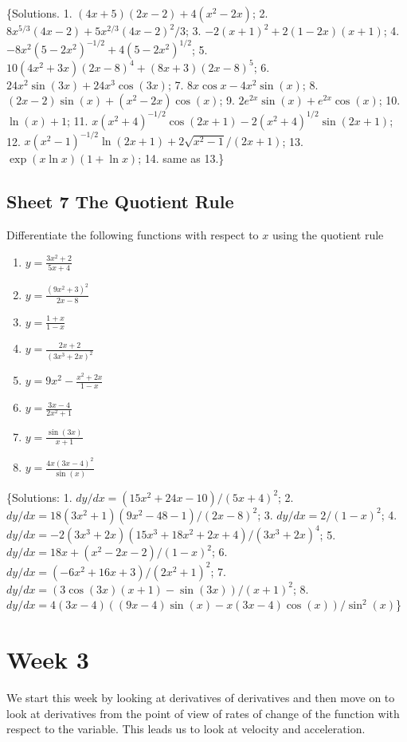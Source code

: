 \documentclass[
  english,
  11pt,
  oneside]{book}
\providecommand{\tightlist}{%
  \setlength{\itemsep}{0pt}\setlength{\parskip}{0pt}}
\newcommand{\slide}{}
\theoremstyle{definition}
\theoremstyle{definition}
\theoremstyle{definition}
\theoremstyle{definition}
\theoremstyle{remark}
\begin{document}
\slide

\{Solutions. 1. \((4x+5)(2x-2)+4(x^2-2x)\); 2. \(8x^{5/3}(4x-2)+5x^{2/3}(4x-2)^2/3\); 3. \(-2(x+1)^2+2(1-2x)(x+1)\); 4. \(-8x^2(5-2x^2)^{-1/2}+4(5-2x^2)^{1/2}\); 5. \(10(4x^2+3x)(2x-8)^4+(8x+3)(2x-8)^5\); 6. \(24x^2\sin(3x)+24x^3\cos(3x)\); 7. \(8x\cos x-4x^2\sin(x)\); 8. \((2x-2)\sin(x)+(x^2-2x)\cos(x)\); 9. \(2e^{2x}\sin(x)+e^{2x}\cos(x)\); 10. \(\ln(x)+1\); 11. \(x(x^2+4)^{-1/2}\cos(2x+1)-2(x^2+4)^{1/2}\sin(2x+1)\); 12. \(x(x^2-1)^{-1/2}\ln(2x+1)+2\sqrt{x^2-1}/(2x+1)\); 13. \(\exp(x\ln x)(1+\ln x)\); 14. same as 13.\}
\slide

\section{Sheet 7 The Quotient Rule}\label{sheet-7-the-quotient-rule}

Differentiate the following functions with respect to \(x\) using the quotient rule

\begin{enumerate}
\def\labelenumi{\arabic{enumi}.}
\tightlist
\item
  \(y=\frac{3x^2+2}{5x+4}\)
\item
  \(y=\frac{(9x^2+3)^2}{2x-8}\)
\item
  \(y=\frac{1+x}{1-x}\)
\item
  \(y=\frac{2x+2}{(3x^3+2x)^2}\)
\item
  \(y=9x^2-\frac{x^2+2x}{1-x}\)
\item
  \(y=\frac{3x-4}{2x^2+1}\)
\item
  \(y=\frac{\sin(3x)}{x+1}\)
\item
  \(y=\frac{4x(3x-4)^2}{\sin(x)}\)
\end{enumerate}

\slide

\{Solutions: 1. \(dy/dx = (15x^2+24x-10)/(5x+4)^2\); 2. \(dy/dx = 18(3x^2+1)(9x^2-48-1)/(2x-8)^2\); 3. \(dy/dx = 2/(1-x)^2\); 4. \(dy/dx = -2(3x^3+2x)(15x^3+18x^2+2x+4)/(3x^3+2x)^4\); 5. \(dy/dx = 18x+(x^2-2x-2)/(1-x)^2\); 6. \(dy/dx = (-6x^2+16x+3)/(2x^2+1)^2\); 7. \(dy/dx = (3\cos(3x)(x+1)-\sin(3x))/(x+1)^2\); 8. \(dy/dx = 4(3x-4)((9x-4)\sin(x)-x(3x-4)\cos(x))/\sin^2(x)\)\}

\chapter{Week 3}\label{week-three}

We start this week by looking at derivatives of derivatives and then move on to look at derivatives from the point of view of rates of change of the function with respect to the variable. This leads us to look at velocity and acceleration.
\slide
\end{document}
